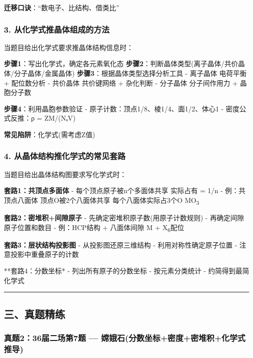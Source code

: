 \textbf{迁移口诀}：``数电子、比结构、借类比''

\subsubsection{3. 从化学式推晶体组成的方法}\label{ux4eceux5316ux5b66ux5f0fux63a8ux6676ux4f53ux7ec4ux6210ux7684ux65b9ux6cd5}

当题目给出化学式要求推晶体结构信息时：

\textbf{步骤1}：写出化学式，确定各元素氧化态
\textbf{步骤2}：判断晶体类型(离子晶体/共价晶体/分子晶体/金属晶体)
\textbf{步骤3}：根据晶体类型选择分析工具
- 离子晶体 \箭 电荷平衡 + 配位数分析
- 共价晶体 \箭 共价键网络 + 杂化判断
- 分子晶体 \箭 分子间作用力 + 晶胞分子数

\textbf{步骤4}：利用晶胞参数验证
- 原子计数：顶点1/8、棱1/4、面1/2、体心1
- 密度公式反推：ρ = ZM/(NₐV)

\textbf{常见陷阱}：化学式(需考虑Z值)

\subsubsection{4. 从晶体结构推化学式的常见套路}\label{ux4eceux6676ux4f53ux7ed3ux6784ux63a8ux5316ux5b66ux5f0fux7684ux5e38ux89c1ux5957ux8def}

当题目给出晶体结构图要求写化学式时：

\textbf{套路1：共顶点多面体}
- 每个顶点原子被n个多面体共享 \箭 实际占有 = 1/n
- 例：共顶点八面体 \箭 顶点O被2个八面体共享 \箭 每个八面体实际占3个O \箭 MO\textsubscript{3}

\textbf{套路2：密堆积+间隙原子}
- 先确定密堆积原子数(用原子计数规则)
- 再确定间隙原子位置和数目
- 例：HCP结构 + 八面体间隙 \箭 M + X\textsubscript{6}配位

\textbf{套路3：层状结构投影图}
- 从投影图还原三维结构
- 利用对称性确定原子位置
- 注意投影中重叠原子的计数

**套路4：分数坐标*
- 列出所有原子的分数坐标
- 按元素分类统计
- 约简得到最简化学式

\begin{center}\rule{0.5\linewidth}{0.5pt}\end{center}

\subsection{三、真题精练}\label{ux4e09ux771fux9898ux7cbeux7ec3-5}

\subsubsection{真题2：36届二场第7题 --- 嫦娥石(分数坐标+密度+密堆积+化学式推导)}\label{ux771fux9898236ux5c4aux4e8cux573aux7b2c7ux9898-ux5ae6ux5a25ux77f3ux5206ux6570ux5750ux6807ux5bc6ux5ea6ux5bc6ux5806ux79efux5316ux5b66ux5f0fux63a8ux5bfc}

